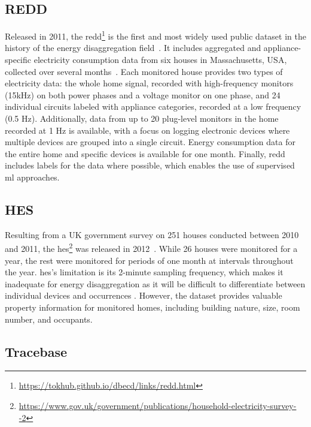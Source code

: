 \subsection{REDD}

Released in 2011, the \acrlong{redd}\footnote{\url{https://tokhub.github.io/dbecd/links/redd.html}} is the first and most widely used public dataset in the history of the energy disaggregation field~\parencite{iqbalCriticalReviewStateoftheart2020}. It includes aggregated and appliance-specific electricity consumption data from six houses in Massachusetts, USA, collected over several months~\parencite{kolterREDDPublicData2011}. Each monitored house provides two types of electricity data: the whole home signal, recorded with high-frequency monitors (15kHz) on both power phases and a voltage monitor on one phase, and 24 individual circuits labeled with appliance categories, recorded at a low frequency (0.5 Hz). Additionally, data from up to 20 plug-level monitors in the home recorded at 1 Hz is available, with a focus on logging electronic devices where multiple devices are grouped into a single circuit. Energy consumption data for the entire home and specific devices is available for one month. Finally, \acrshort{redd} includes labels for the data where possible, which enables the use of supervised \acrshort{ml} approaches.

\subsection{HES}

Resulting from a UK government survey on 251 houses conducted between 2010 and 2011, the \acrlong{hes}\footnote{\url{https://www.gov.uk/government/publications/household-electricity-survey--2}} was released in 2012~\parencite{zimmermannHouseholdElectricitySurvey2012}. While 26 houses were monitored for a year, the rest were monitored for periods of one month at intervals throughout the year. \acrshort{hes}'s limitation is its 2-minute sampling frequency, which makes it inadequate for energy disaggregation as it will be difficult to differentiate between individual devices and occurrences \parencite{himeurBuildingPowerConsumption2020}. However, the dataset provides valuable property information for monitored homes, including building nature, size, room number, and occupants.

\subsection{Tracebase}

